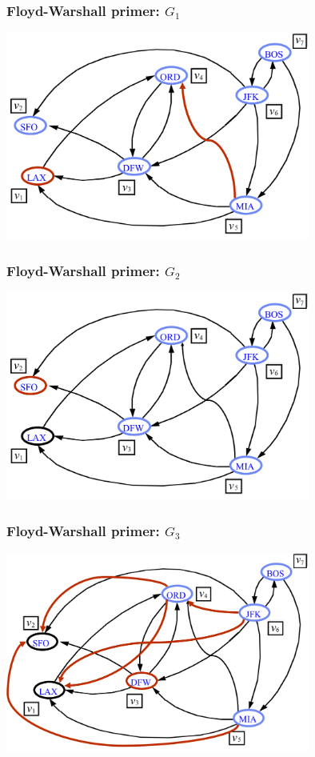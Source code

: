 \documentclass[compress,aspectratio=169]{beamer}
\begin{document}
\begin{frame}[fragile]
  \frametitle{Floyd-Warshall primer: $G_1$}
  \begin{center}
    \includegraphics[width=10cm]{asp-14-pic38.png}
  \end{center}
\end{frame}

\begin{frame}[fragile]
  \frametitle{Floyd-Warshall primer: $G_2$}
  \begin{center}
    \includegraphics[width=10cm]{asp-14-pic39.png}
  \end{center}
\end{frame}

\begin{frame}[fragile]
  \frametitle{Floyd-Warshall primer: $G_3$}
  \begin{center}
    \includegraphics[width=10cm]{asp-14-pic40.png}
  \end{center}
\end{frame}
\end{document}
